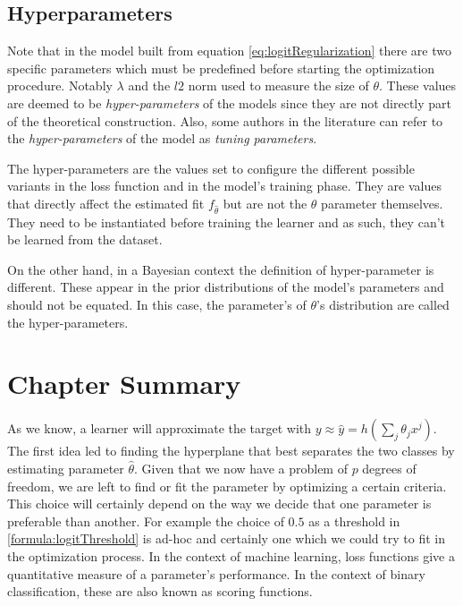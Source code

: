\subsection{Hyperparameters}



Note that in the model built from equation \cref{eq:logitRegularization} there are two specific parameters which must be predefined before starting the optimization procedure. Notably $\lambda$ and the $l2$ norm used to measure the size of $\theta$. These values are deemed to be \textit{hyper-parameters} of the models since they are not directly part of the theoretical construction. Also, some authors in the literature can refer to the \textit{hyper-parameters} of the model as \textit{tuning parameters}.

The hyper-parameters are the values set to configure the different possible variants in the loss function and in the model's training phase. They are values that directly affect the estimated fit $f_{\hat{\theta}}$ but are not the $\theta$ parameter themselves. They need to be instantiated before training the learner and as such, they can't be learned from the dataset.

On the other hand, in a Bayesian context the definition of hyper-parameter is different. These appear in the prior distributions of the model's parameters and should not be equated. In this case, the parameter's of $\theta$'s distribution are called the hyper-parameters.




\section{Chapter Summary}\label{section-ch_machine_learning_summary}

As we know, a learner will approximate the target with $y \approx \hat{y} = h\left(\sum_{j}\theta_j x^j\right)$. The first idea led to finding the hyperplane that best separates the two classes by estimating parameter $\hat{\theta}$. Given that we now have a problem of $p$ degrees of freedom, we are left to find or fit the parameter by optimizing a certain criteria. This choice will certainly depend on the way we decide that one parameter is preferable than another. For example the choice of $0.5$ as a threshold in \cref{formula:logitThreshold} is ad-hoc and certainly one which we could try to fit in the optimization process. In the context of machine learning, loss functions give a quantitative measure of a parameter's performance. In the context of binary classification, these are also known as scoring functions.

